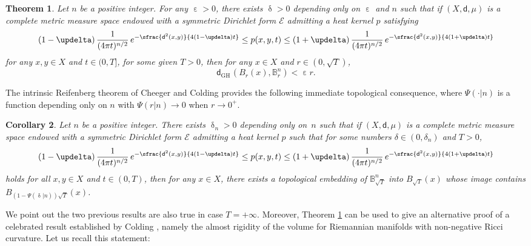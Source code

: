 \documentclass[10pt]{amsart}
\newcommand{\sGH}{{\scriptscriptstyle\mathrm{GH}\,}}
\theoremstyle{plain}
\newtheorem{theorem}{Theorem}[section]
\newtheorem{corollary}[theorem]{Corollary}
\theoremstyle{definition}
\newcommand{\setB}{\mathbb{B}}
\newcommand{\cE}{\mathcal{E}}
\newcommand{\dist}{\mathsf{d}}
\begin{document}
\begin{theorem}\label{th:almostrigidity} Let $n$ be a positive integer. For any $\upepsilon>0$, there exists $\updelta>0$ depending only on $\upepsilon$ and $n$ such that if $(X,\dist,\mu)$ is a complete metric measure space endowed with a symmetric Dirichlet form $\cE$
admitting a heat kernel $p$ satisfying
\begin{equation}\label{eq:almostheatkernel}
(1-\updelta)\, \frac{1}{(4 \pi t)^{n/2}}\, e^{-\sfrac{\dist^2(x,y)}{4(1-\updelta)t}}\le p(x,y,t) \le (1+\updelta)\, \frac{1}{(4 \pi t)^{n/2}}\, e^{-\sfrac{\dist^2(x,y)}{4(1+\updelta)t}}
\end{equation}
for any $x,y \in X$ and $t \in (0,T]$, for some given $T>0$, then for any $x \in X$ and $r \in (0,\sqrt{T})$,
\begin{equation}%
\dist_{\sGH}\left(B_r(x), \setB^n_r\right)< \upepsilon r.
\end{equation}
\end{theorem}


The intrinsic Reifenberg theorem of Cheeger and Colding \cite[Th.\,A.1.1.]{CheegerColding} provides the following immediate topological consequence, where $\Psi(\cdot|n)$ is a function depending only on $n$ with $\Psi(r|n) \to 0$ when $r \to 0^+$.

\begin{corollary}\label{cor:topo} Let $n$ be a positive integer. There exists $\updelta_n>0$ depending only on~$n$ such that if $(X,\dist,\mu)$ is a complete metric measure space endowed with a symmetric Dirichlet form $\cE$ admitting a heat kernel $p$ such that for some numbers $\delta \in (0,\delta_n)$ and $T>0$,
\[
(1-\updelta)\,\frac{1}{(4 \pi t)^{n/2}}\, e^{-\sfrac{\dist^2(x,y)}{4(1-\updelta) t}}\le p(x,y,t) \le (1+\updelta)\,\frac{1}{(4 \pi t)^{n/2}}\, e^{-\sfrac{\dist^2(x,y)}{4(1+\updelta) t}}
\]holds for all $x, y \in X$ and $t \in (0,T)$, then for any $x \in X$, there exists a topological embedding of $\mathbb{B}_{\sqrt{T}}^{n}$ into $B_{\sqrt{T}}(x)$ whose image contains $B_{(1-\Psi(\updelta|n))\sqrt{T}}(x)$.\end{corollary}

We point out the two previous results are also true in case $T=+\infty$. Moreover, Theorem \ref{th:almostrigidity} can be used to give an alternative proof of a celebrated result established by Colding \cite[Th.\,0.8]{Colding}, namely the almost rigidity of the volume for Riemannian manifolds with non-negative Ricci curvature. Let us recall this statement:
\end{document}
